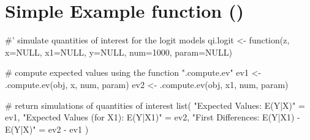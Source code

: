 \section{Simple Example  function ()}


\begin{Code}
#' simulate quantities of interest for the logit models
qi.logit <- function(z, x=NULL, x1=NULL, y=NULL, num=1000, param=NULL) {

  # compute expected values using the function ".compute.ev"
  ev1 <- .compute.ev(obj, x, num, param)
  ev2 <- .compute.ev(obj, x1, num, param)

  # return simulations of quantities of interest
  list(
       "Expected Values: E(Y|X)"  = ev1,
       "Expected Values (for X1): E(Y|X1)" = ev2,
       "First Differences: E(Y|X1) - E(Y|X)" = ev2 - ev1
       )
}
\end{Code}